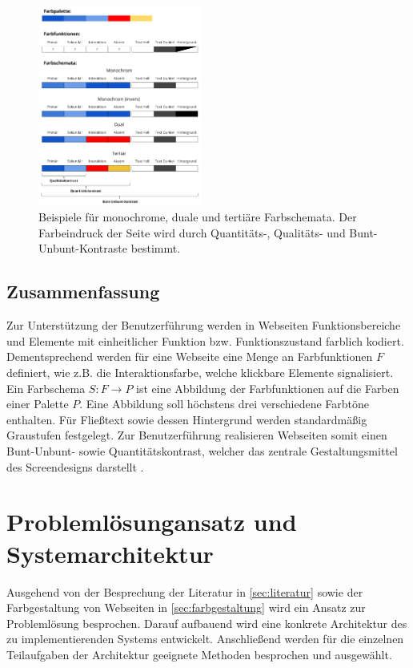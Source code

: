 \documentclass[11pt, bibliography=totoc]{scrartcl}
\begin{document}
\begin{figure}[h]
	\centering
	\includegraphics[width=0.48\textwidth]{img/colorschemes.png}
	\caption{Beispiele für monochrome, duale und tertiäre Farbschemata. Der Farbeindruck der Seite wird durch Quantitäts-, Qualitäts- und Bunt-Unbunt-Kontraste bestimmt.}
	\label{fig:colorschemes}
\end{figure}

\subsection*{Zusammenfassung}
Zur Unterstützung der Benutzerführung werden in Webseiten Funktionsbereiche und Elemente mit einheitlicher Funktion bzw. Funktionszustand farblich kodiert. Dementsprechend werden für eine Webseite eine Menge an Farbfunktionen $F$ definiert, wie z.B. die Interaktionsfarbe, welche klickbare Elemente signalisiert. Ein Farbschema $S: F \to P$ ist eine Abbildung der Farbfunktionen auf die Farben einer Palette $P$. Eine Abbildung soll höchstens drei verschiedene Farbtöne enthalten. Für Fließtext sowie dessen Hintergrund werden standardmäßig Graustufen festgelegt. Zur Benutzerführung realisieren Webseiten somit einen Bunt-Unbunt- sowie Quantitätskontrast, welcher das zentrale Gestaltungsmittel des Screendesigns darstellt \citep{webdesign, webx0}.









\section{Problemlösungansatz und Systemarchitektur}

Ausgehend von der Besprechung der Literatur in \autoref{sec:literatur} sowie der Farbgestaltung von Webseiten in \autoref{sec:farbgestaltung} wird ein Ansatz zur Problemlösung besprochen. Darauf aufbauend wird eine konkrete Architektur des zu implementierenden Systems entwickelt. Anschließend werden für die einzelnen Teilaufgaben der Architektur geeignete Methoden besprochen und ausgewählt.
\end{document}
